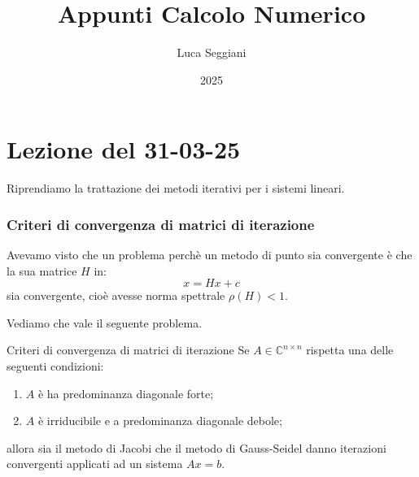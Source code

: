 \documentclass[a4paper,11pt]{article}
\title{Appunti Calcolo Numerico}
\author{Luca Seggiani}
\date{2025}
\begin{document}
\section{Lezione del 31-03-25}

\thispagestyle{empty}
\pagestyle{fancy}

Riprendiamo la trattazione dei metodi iterativi per i sistemi lineari.

\subsubsection{Criteri di convergenza di matrici di iterazione}
Avevamo visto che un problema perchè un metodo di punto sia convergente è che la sua matrice $H$ in:
$$
x = H x + c
$$
sia convergente, cioè avesse norma spettrale $\rho(H) < 1$.

Vediamo che vale il seguente problema.
\begin{theorem}{Criteri di convergenza di matrici di iterazione}
	Se $A \in \mathbb{C}^{n \times n}$ rispetta una delle seguenti condizioni:
	\begin{enumerate}
		\item $A$ è ha predominanza diagonale forte;
		\item $A$ è irriducibile e a predominanza diagonale debole;
	\end{enumerate}
	allora sia il metodo di Jacobi che il metodo di Gauss-Seidel danno iterazioni convergenti applicati ad un sistema $Ax = b$. 
\end{theorem}
\end{document}
